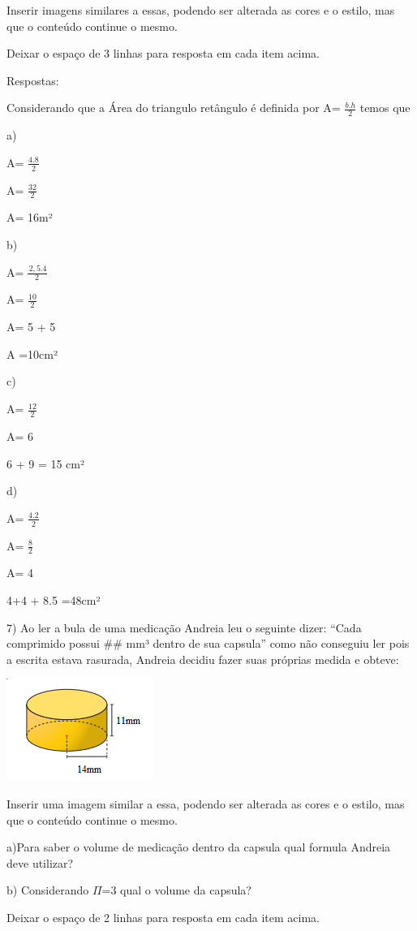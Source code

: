 {Inserir imagens similares a essas, podendo ser alterada as cores e o
estilo, mas que o conteúdo continue o mesmo.

Deixar o espaço de 3 linhas para resposta em cada item acima.

Respostas:

Considerando que a Área do triangulo retângulo é definida por A=
\(\frac{b.h}{2}\) temos que

a)

A= \(\frac{4.8}{2}\)

A= \(\frac{32}{2}\)

A= 16m²

b)

A=\(\ \frac{\ 2,5.4}{2}\)

A= \(\frac{10}{2}\)

A= 5 + 5

A =10cm²

c)

A= \(\frac{12}{2}\)

A= 6

6 + 9 = 15 cm²

d)

A= \(\frac{4.2}{2}\)

A= \(\frac{8}{2}\)

A= 4

4+4 + 8.5 =48cm²

7) Ao ler a bula de uma medicação Andreia leu o seguinte dizer: ``Cada
comprimido possui \#\# mm³ dentro de sua capsula'' como não conseguiu
ler pois a escrita estava rasurada, Andreia decidiu fazer suas próprias
medida e obteve:

\includegraphics[width=1.88542in,height=1.3125in]{./imgSAEB_8_MAT/media/image50.png}

Inserir uma imagem similar a essa, podendo ser alterada as cores e o
estilo, mas que o conteúdo continue o mesmo.

a)Para saber o volume de medicação dentro da capsula qual formula
Andreia deve utilizar?

b) Considerando \(\Pi\)=3 qual o volume da capsula?

Deixar o espaço de 2 linhas para resposta em cada item acima.

}
